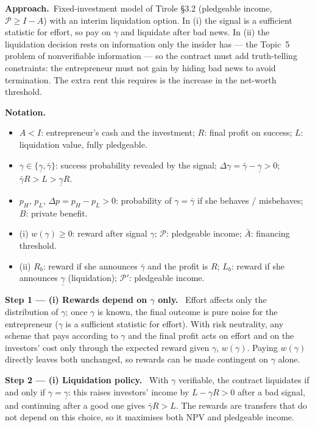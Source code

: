 \documentclass[11pt,a4paper]{article}
\newcommand{\notation}{\par\noindent\textbf{Notation.}}
\newcommand{\step}[2]{\par\medskip\noindent\textbf{Step #1 --- #2.}~}
\newcommand{\approach}{\par\smallskip\noindent\textbf{Approach.}~}
\begin{document}
\approach Fixed-investment model of Tirole \S3.2 (pledgeable income, $\mathcal P\ge I-A$) with an
interim liquidation option. In (i) the signal is a sufficient statistic for effort, so pay on $\gamma$
and liquidate after bad news. In (ii) the liquidation decision rests on information only the insider
has --- the Topic~5 problem of nonverifiable information --- so the contract must add truth-telling
constraints: the entrepreneur must not gain by hiding bad news to avoid termination. The extra rent
this requires is the increase in the net-worth threshold.

\notation
\begin{itemize}
  \item $A<I$: entrepreneur's cash and the investment; $R$: final profit on success; $L$: liquidation value, fully pledgeable.
  \item $\gamma\in\{\underline\gamma,\bar\gamma\}$: success probability revealed by the signal; $\Delta\gamma=\bar\gamma-\underline\gamma>0$; $\bar\gamma R>L>\underline\gamma R$.
  \item $p_H$, $p_L$, $\Delta p=p_H-p_L>0$: probability of $\gamma=\bar\gamma$ if she behaves / misbehaves; $B$: private benefit.
  \item (i) $w(\gamma)\geq0$: reward after signal $\gamma$; $\mathcal P$: pledgeable income; $\bar A$: financing threshold.
  \item (ii) $R_b$: reward if she announces $\bar\gamma$ and the profit is $R$; $L_b$: reward if she announces $\underline\gamma$ (liquidation); $\mathcal P'$: pledgeable income.
\end{itemize}

\step{1}{(i) Rewards depend on $\gamma$ only} Effort affects only the distribution of $\gamma$; once
$\gamma$ is known, the final outcome is pure noise for the entrepreneur ($\gamma$ is a sufficient
statistic for effort). With risk neutrality, any scheme that pays according to $\gamma$ and the final
profit acts on effort and on the investors' cost only through the expected reward given $\gamma$,
$w(\gamma)$. Paying $w(\gamma)$ directly leaves both unchanged, so rewards can be made contingent on
$\gamma$ alone.

\step{2}{(i) Liquidation policy} With $\gamma$ verifiable, the contract liquidates if and only if
$\gamma=\underline\gamma$: this raises investors' income by $L-\underline\gamma R>0$ after a bad signal,
and continuing after a good one gives $\bar\gamma R>L$. The rewards are transfers that do not depend
on this choice, so it maximises both NPV and pledgeable income.
\end{document}
